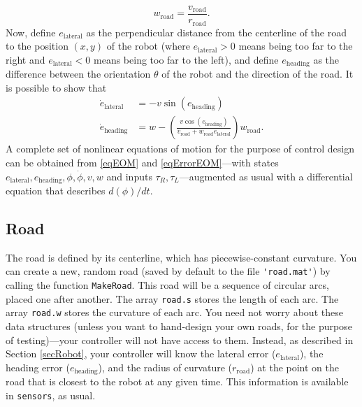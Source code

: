 \documentclass[12pt]{article}
\begin{document}
\begin{equation}
\label{eqCurvature}
w_\text{road} = \frac{v_\text{road}}{r_\text{road}}.
\end{equation}
Now, define $e_\text{lateral}$ as the perpendicular distance from the centerline of the road to the position $(x,y)$ of the robot (where $e_\text{lateral}>0$ means being too far to the right and $e_\text{lateral}<0$ means being too far to the left), and define $e_\text{heading}$ as the difference between the orientation $\theta$ of the robot and the direction of the road. It is possible to show that
\begin{equation}
\label{eqErrorEOM}
\begin{aligned}
\dot{e}_\text{lateral} &= -v\sin\left(e_\text{heading}\right) \\
\dot{e}_\text{heading} &= w-\left(\frac{v\cos\left(e_\text{heading}\right)}{v_\text{road}+w_\text{road}e_\text{lateral}}\right)w_\text{road}.
\end{aligned}
\end{equation}
A complete set of nonlinear equations of motion for the purpose of control design can be obtained from \eqref{eqEOM} and \eqref{eqErrorEOM}---with states $e_\text{lateral}, e_\text{heading}, \phi, \dot{\phi}, v, w$ and inputs $\tau_{R},\tau_{L}$---augmented as usual with a differential equation that describes $d(\phi)/dt$.

\subsection{Road}

The road is defined by its centerline, which has piecewise-constant curvature. You can create a new, random road (saved by default to the file \lstinline|'road.mat'|) by calling the function \lstinline|MakeRoad|. This road will be a sequence of circular arcs, placed one after another. The array \lstinline|road.s| stores the length of each arc. The array \lstinline|road.w| stores the curvature of each arc. You need not worry about these data structures (unless you want to hand-design your own roads, for the purpose of testing)---your controller will not have access to them. Instead, as described in Section \ref{secRobot}, your controller will know the lateral error ($e_\text{lateral}$), the heading error ($e_\text{heading}$), and the radius of curvature ($r_\text{road}$) at the point on the road that is closest to the robot at any given time. This information is available in \lstinline|sensors|, as usual.
\end{document}
